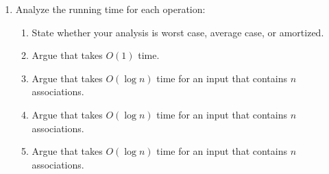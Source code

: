 \documentclass{article}
\begin{document}
\begin{enumerate}
\begin{enumerate}
  \item Analyze the running time for each operation:
    \begin{enumerate}
    \item State whether your analysis is worst case, average case, or
      amortized.
    \item Argue that  takes \(O(1)\) time.
    \item Argue that  takes \(O(\log n)\) time for an
      input that contains \(n\) associations.
    \item Argue that  takes \(O(\log n)\) time for an
      input that contains \(n\) associations.
    \item Argue that  takes \(O(\log n)\) time for an
      input that contains \(n\) associations.
    \end{enumerate}
  \end{enumerate}


\end{enumerate}
\end{document}
